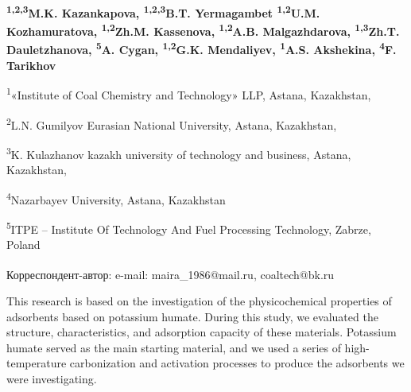 
\begin{articleheader}

{\bfseries
\textsuperscript{1,2,3}M.K. Kazankapova\textsuperscript{\envelope },
\textsuperscript{1,2,3}B.T. Yermagambet
\textsuperscript{1,2}U.M. Kozhamuratova,
\textsuperscript{1,2}Zh.M. Kassenova,
\textsuperscript{1,2}A.B. Malgazhdarova,
\textsuperscript{1,3}Zh.T. Dauletzhanova,
\textsuperscript{5}A. Cygan,
\textsuperscript{1,2}G.K. Mendaliyev,
\textsuperscript{1}A.S. Akshekina,
\textsuperscript{4}F. Tarikhov
}
\end{articleheader}

\begin{affiliation}
\textsuperscript{1}«Institute of Coal Chemistry and Technology» LLP, Astana, Kazakhstan,

\textsuperscript{2}L.N. Gumilyov Eurasian National University, Astana, Kazakhstan,

\textsuperscript{3}K. Kulazhanov kazakh university of technology and business, Astana, Kazakhstan,

\textsuperscript{4}Nazarbayev University, Astana, Kazakhstan

\textsuperscript{5}ITPE -- Institute Of Technology And Fuel Processing Technology, Zabrze, Poland

\raggedright \textsuperscript{\envelope }Корреспондент-автор: e-mail: maira\_1986@mail.ru, coaltech@bk.ru
\end{affiliation}

This research is based on the investigation of the physicochemical
properties of adsorbents based on potassium humate. During this study,
we evaluated the structure, characteristics, and adsorption capacity of
these materials. Potassium humate served as the main starting material,
and we used a series of high-temperature carbonization and activation
processes to produce the adsorbents we were investigating.


